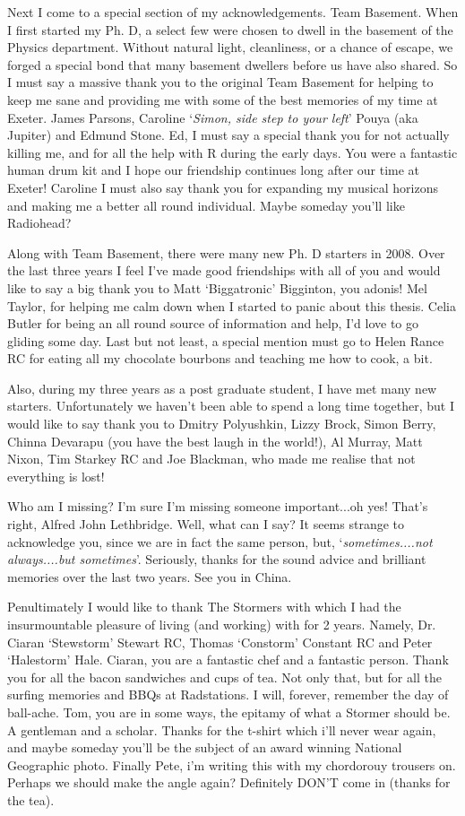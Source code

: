 Next I come to a special section of my acknowledgements. Team Basement. When I first started my Ph. D, a select few were chosen to dwell in the basement of the Physics department. Without natural light, cleanliness, or a chance of escape, we forged a special bond that many basement dwellers before us have also shared. So I must say a massive thank you to the original Team Basement for helping to keep me sane and providing me with some of the best memories of my time at Exeter. James Parsons, Caroline `\textit{Simon, side step to your left}' Pouya (aka Jupiter) and Edmund Stone. Ed, I must say a special thank you for not actually killing me, and for all the help with R during the early days. You were a fantastic human drum kit and I hope our friendship continues long after our time at Exeter! Caroline I must also say thank you for expanding my musical horizons and making me a better all round individual. Maybe someday you'll like Radiohead?

Along with Team Basement, there were many new Ph. D starters in 2008. Over the last three years I feel I've made good friendships with all of you and would like to say a big thank you to Matt `Biggatronic' Bigginton, you adonis! Mel Taylor, for helping me calm down when I started to panic about this thesis. Celia Butler for being an all round source of information and help, I'd love to go gliding some day. Last but not least, a special mention must go to Helen Rance RC for eating all my chocolate bourbons and teaching me how to cook, a bit. 

Also, during my three years as a post graduate student, I have met many new starters. Unfortunately we haven't been able to spend a long time together, but I would like to say thank you to Dmitry Polyushkin, Lizzy Brock, Simon Berry, Chinna Devarapu (you have the best laugh in the world!), Al Murray, Matt Nixon, Tim Starkey RC and Joe Blackman, who made me realise that not everything is lost! 

Who am I missing? I'm sure I'm missing someone important...oh yes! That's right, Alfred John Lethbridge. Well, what can I say? It seems strange to acknowledge you, since we are in fact the same person, but, `\textit{sometimes....not always....but sometimes}'. Seriously, thanks for the sound advice and brilliant memories over the last two years. See you in China.

Penultimately I would like to thank The Stormers with which I had the insurmountable pleasure of living (and working) with for 2 years. Namely, Dr. Ciaran `Stewstorm' Stewart RC, Thomas `Constorm' Constant RC and Peter `Halestorm' Hale. Ciaran, you are a fantastic chef and a fantastic person. Thank you for all the bacon sandwiches and cups of tea. Not only that, but for all the surfing memories and BBQs at Radstations. I will, forever, remember the day of ball-ache. Tom, you are in some ways, the epitamy of what a Stormer should be. A gentleman and a scholar. Thanks for the t-shirt which i'll never wear again, and maybe someday you'll be the subject of an award winning National Geographic photo. Finally Pete, i'm writing this with my chordorouy trousers on. Perhaps we should make the angle again? Definitely DON'T come in (thanks for the tea).

